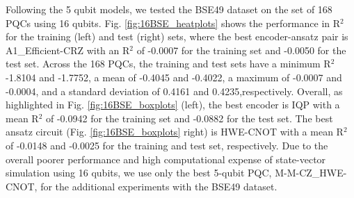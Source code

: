 \documentclass[journal=jacsat,manuscript=article]{achemso}
\begin{document}
Following the 5 qubit models, we tested the BSE49 dataset on the set of 168 PQCs using 16 qubits.
Fig. \ref{fig:16BSE_heatplots} shows the performance in R$^{2}$ for the training (left) and test (right) sets, where the best encoder-ansatz pair is A1{\_}Efficient-CRZ with an R$^{2}$ of -0.0007 for the training set and -0.0050 for the test set.
Across the 168 PQCs, the training and test sets have a minimum R$^{2}$ -1.8104 and -1.7752, a mean of -0.4045 and -0.4022, a maximum of -0.0007 and -0.0004, and a standard deviation of 0.4161 and 0.4235,respectively.
Overall, as highlighted in Fig. \ref{fig:16BSE_boxplots} (left), the best encoder is IQP with a mean R$^{2}$ of -0.0942 for the training set and -0.0882 for the test set.
The best ansatz circuit (Fig. \ref{fig:16BSE_boxplots} right) is HWE-CNOT with a mean R$^{2}$ of -0.0148 and -0.0025 for the training and test set, respectively.
Due to the overall poorer performance and high computational expense of state-vector simulation using 16 qubits, we use only the best 5-qubit PQC, M-M-CZ{\_}HWE-CNOT, for the additional experiments with the BSE49 dataset.
\end{document}
